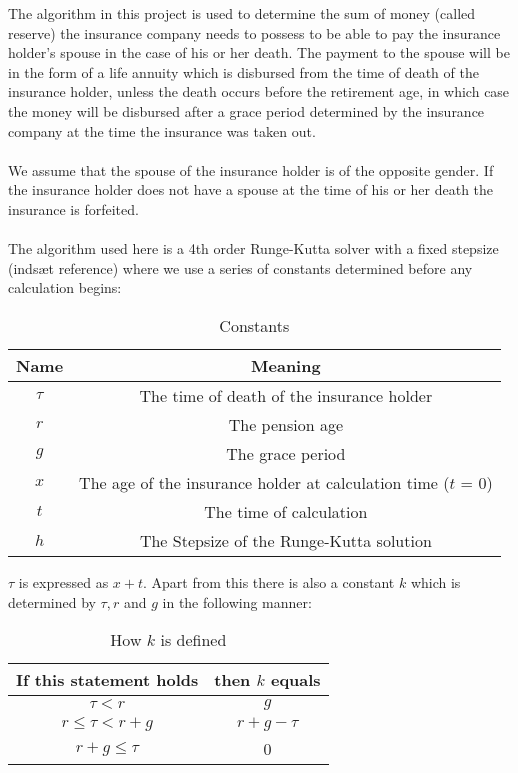 
The algorithm in this project is used to determine the sum of money (called reserve) the insurance company needs to possess to be able to pay the insurance holder's spouse in the case of his or her death. The payment to the spouse will be in the form of a life annuity which is disbursed from the time of death of the insurance holder, unless the death occurs before the retirement age, in which case the money will be disbursed after a grace period determined by the insurance company at the time the insurance was taken out. 
\\
\\ We assume that the spouse of the insurance holder is of the opposite gender. If the insurance holder does not have a spouse at the time of his or her death the insurance is forfeited.
\\
\\The algorithm used here is a 4th order Runge-Kutta solver with a fixed stepsize (indsæt reference) where we use a series of constants determined before any calculation begins:

\begin{table}
\begin{center}
\begin{tabular}[t]{|c|c|}
	\hline
\textbf{Name}&\textbf{Meaning}\\\hline
$\tau$&The time of death of the insurance holder\\\hline
$r$&The pension age\\\hline
$g$&The grace period\\\hline
$x$&The age of the insurance holder at calculation time ($t$ = 0)\\\hline
$t$&The time of calculation\\\hline
$h$&The Stepsize of the Runge-Kutta solution\\\hline
\end{tabular}
\end{center}
\caption{Constants}
\label{table:constants}
\end{table}

$\tau$ is expressed as $x+t$. Apart from this there is also a constant $k$ which is determined by $\tau, r$ and $g$ in the following manner:

\begin{table}
\begin{center}
	\begin{tabular}[t]{|c|c|}
		\hline
		\textbf{If this statement holds}&\textbf{then $k$ equals}\\\hline
		$\tau < r$&$g$\\\hline
		$r \leq \tau < r + g$& $r + g - \tau$\\\hline
		$r + g \leq \tau$&0\\\hline
	\end{tabular}
\end{center}
\caption{How $k$ is defined}
\end{table}

